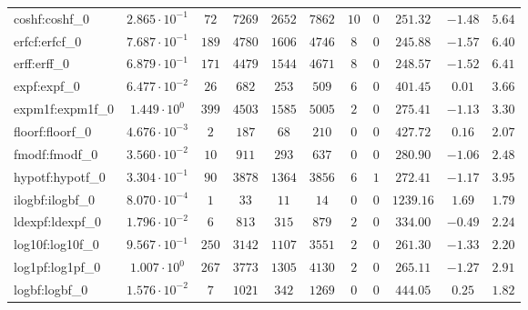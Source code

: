 \begin{tabular}{|l|c|c|c|c|c|c|c|c|c|c|}
coshf:coshf\_0               & $ 2.865 \cdot 10^{-1} $ & $ 72     $ & $ 7269   $ & $ 2652  $ & $ 7862   $ & $ 10  $ & $ 0 $ & $ 251.32      $ & $ -1.48   $ & $ 5.64    $ \\
erfcf:erfcf\_0               & $ 7.687 \cdot 10^{-1} $ & $ 189    $ & $ 4780   $ & $ 1606  $ & $ 4746   $ & $ 8   $ & $ 0 $ & $ 245.88      $ & $ -1.57   $ & $ 6.40    $ \\
erff:erff\_0                 & $ 6.879 \cdot 10^{-1} $ & $ 171    $ & $ 4479   $ & $ 1544  $ & $ 4671   $ & $ 8   $ & $ 0 $ & $ 248.57      $ & $ -1.52   $ & $ 6.41    $ \\
expf:expf\_0                 & $ 6.477 \cdot 10^{-2} $ & $ 26     $ & $ 682    $ & $ 253   $ & $ 509    $ & $ 6   $ & $ 0 $ & $ 401.45      $ & $ 0.01    $ & $ 3.66    $ \\
expm1f:expm1f\_0             & $ 1.449 \cdot 10^{0}  $ & $ 399    $ & $ 4503   $ & $ 1585  $ & $ 5005   $ & $ 2   $ & $ 0 $ & $ 275.41      $ & $ -1.13   $ & $ 3.30    $ \\
floorf:floorf\_0             & $ 4.676 \cdot 10^{-3} $ & $ 2      $ & $ 187    $ & $ 68    $ & $ 210    $ & $ 0   $ & $ 0 $ & $ 427.72      $ & $ 0.16    $ & $ 2.07    $ \\
fmodf:fmodf\_0               & $ 3.560 \cdot 10^{-2} $ & $ 10     $ & $ 911    $ & $ 293   $ & $ 637    $ & $ 0   $ & $ 0 $ & $ 280.90      $ & $ -1.06   $ & $ 2.48    $ \\
hypotf:hypotf\_0             & $ 3.304 \cdot 10^{-1} $ & $ 90     $ & $ 3878   $ & $ 1364  $ & $ 3856   $ & $ 6   $ & $ 1 $ & $ 272.41      $ & $ -1.17   $ & $ 3.95    $ \\
ilogbf:ilogbf\_0             & $ 8.070 \cdot 10^{-4} $ & $ 1      $ & $ 33     $ & $ 11    $ & $ 14     $ & $ 0   $ & $ 0 $ & $ 1239.16     $ & $ 1.69    $ & $ 1.79    $ \\
ldexpf:ldexpf\_0             & $ 1.796 \cdot 10^{-2} $ & $ 6      $ & $ 813    $ & $ 315   $ & $ 879    $ & $ 2   $ & $ 0 $ & $ 334.00      $ & $ -0.49   $ & $ 2.24    $ \\
log10f:log10f\_0             & $ 9.567 \cdot 10^{-1} $ & $ 250    $ & $ 3142   $ & $ 1107  $ & $ 3551   $ & $ 2   $ & $ 0 $ & $ 261.30      $ & $ -1.33   $ & $ 2.20    $ \\
log1pf:log1pf\_0             & $ 1.007 \cdot 10^{0}  $ & $ 267    $ & $ 3773   $ & $ 1305  $ & $ 4130   $ & $ 2   $ & $ 0 $ & $ 265.11      $ & $ -1.27   $ & $ 2.91    $ \\
logbf:logbf\_0               & $ 1.576 \cdot 10^{-2} $ & $ 7      $ & $ 1021   $ & $ 342   $ & $ 1269   $ & $ 0   $ & $ 0 $ & $ 444.05      $ & $ 0.25    $ & $ 1.82    $ \\

\end{tabular}

